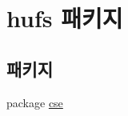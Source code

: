 \hypertarget{namespacehufs}{}\section{hufs 패키지}
\label{namespacehufs}
\subsection*{패키지}
\begin{DoxyCompactItemize}
\item 
package \hyperlink{namespacehufs_1_1cse}{cse}
\end{DoxyCompactItemize}
